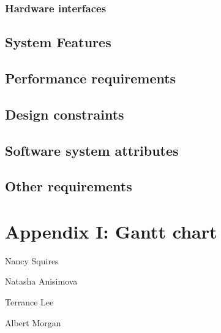 \documentclass[10pt,journal,draftclsnofoot,onecolumn]{IEEEtran}
\begin{document}
	\subsubsection{Hardware interfaces}

	\subsection{System Features}	
	\subsection{Performance requirements}
	\subsection{Design constraints}
	\subsection{Software system attributes}
	\subsection{Other requirements}

	
	
\section{Appendix I: Gantt chart}

\begin{minipage}{\textwidth}
	
	\vspace{1in}
	\noindent Nancy Squires

	\vspace{1in}
	\noindent Natasha Anisimova

	\vspace{1in}
	\noindent Terrance Lee

	\vspace{1in}
	\noindent Albert Morgan\\

\end{minipage}
\end{document}
